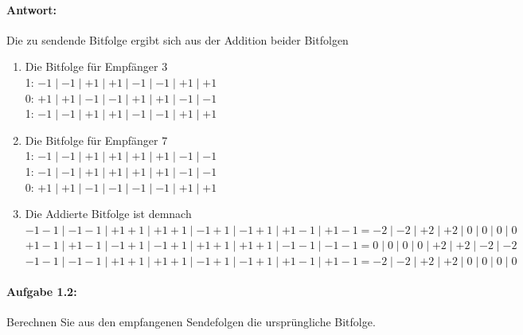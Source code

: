 \paragraph{Antwort:} Die zu sendende Bitfolge ergibt sich aus der Addition beider Bitfolgen
	\begin{enumerate}

	\item Die Bitfolge für Empfänger $3$
		\\ 1: $-1\mid -1\mid +1\mid +1\mid -1\mid -1\mid +1\mid +1$
		\\ 0: $+1\mid +1\mid -1\mid -1\mid +1\mid +1\mid -1\mid -1$
		\\ 1: $-1\mid -1\mid +1\mid +1\mid -1\mid -1\mid +1\mid +1$
	\item Die Bitfolge für Empfänger $7$	
		\\ 1: $-1\mid -1\mid +1\mid +1\mid +1\mid +1\mid -1\mid -1$
		\\ 1: $-1\mid -1\mid +1\mid +1\mid +1\mid +1\mid -1\mid -1$
		\\ 0: $+1\mid +1\mid -1\mid -1\mid -1\mid -1\mid +1\mid +1$
	\item Die Addierte Bitfolge ist demnach
		\\$-1-1\mid -1-1\mid +1+1\mid +1+1\mid -1+1\mid -1+1\mid +1-1\mid +1-1 = -2\mid -2\mid +2\mid +2\mid 0\mid 0\mid 0\mid 0$
		\\$+1-1\mid +1-1\mid -1+1\mid -1+1\mid +1+1\mid +1+1\mid -1-1\mid -1-1 = 0\mid 0\mid 0\mid 0\mid +2\mid +2\mid -2\mid -2$
		\\$-1-1\mid -1-1\mid +1+1\mid +1+1\mid -1+1\mid -1+1\mid +1-1\mid +1-1 = -2\mid -2\mid +2\mid +2\mid 0\mid 0\mid 0\mid 0$
	\end{enumerate}
\paragraph{Aufgabe 1.2:}
	Berechnen Sie aus den empfangenen Sendefolgen die ursprüngliche Bitfolge.
